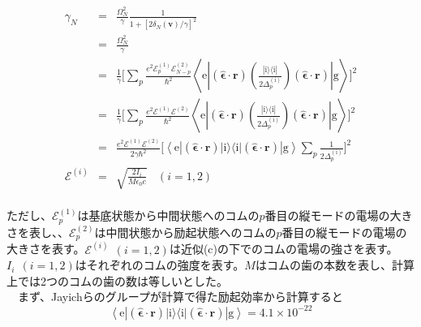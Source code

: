 \documentclass[uplatex, dvipdfmx, a4paper, report, papersize, 11pt]{jsbook}
\begin{document}
\begin{eqnarray}
  \gamma_N &=& \frac{\Omega^2_N}{\gamma}\frac{1}{1 + [2\delta_N(\bm{v})/\gamma]^2} \nonumber\\
  &=& \frac{\Omega^2_N}{\gamma}  \nonumber\\
  &=& \frac{1}{\gamma} \Biggl[ \sum _ { p } \frac { e ^ { 2 } \mathcal { E } ^{(1)}_ { p } \mathcal { E }^{(2)} _ { N - p } } { \hbar ^ { 2 } } \left\langle \mathrm { e } \left| ( \hat { \boldsymbol { \epsilon } } \cdot \mathbf { r } ) \left(  \frac { | \mathrm { i } \rangle \langle \mathrm { i } | } { 2 \Delta _ { p } ^ { ( \mathrm { i } ) } } \right) ( \hat { \boldsymbol { \epsilon } } \cdot \mathbf { r } ) \right| \mathrm { g } \right\rangle \Biggr]^2 \nonumber \\
  &=& \frac{1}{\gamma} \Biggl[ \sum _ { p } \frac { e ^ { 2 } \mathcal { E }^{(1)} \mathcal { E } ^ {(2)} } { \hbar ^ { 2 } } \left\langle \mathrm { e } \left| ( \hat { \boldsymbol { \epsilon } } \cdot \mathbf { r } ) \left(  \frac { | \mathrm { i } \rangle \langle \mathrm { i } | } { 2 \Delta _ { p } ^ { ( \mathrm { i } ) } } \right) ( \hat { \boldsymbol { \epsilon } } \cdot \mathbf { r } ) \right| \mathrm { g } \right\rangle \Biggr]^2 \nonumber \\
  &=& \frac{e^2  \mathcal { E } ^ {(1)} \mathcal { E } ^ {(2)}}{ 2 \gamma \hbar ^ { 2 }  }\Biggl[ \left\langle \mathrm { e } \left| ( \hat { \boldsymbol { \epsilon } } \cdot \mathbf { r } ) | \mathrm { i } \rangle \langle \mathrm { i } |  ( \hat { \boldsymbol { \epsilon } } \cdot \mathbf { r } ) \right| \mathrm { g } \right\rangle\sum _ { p }\frac{1}{2 \Delta _ { p } ^ { ( \mathrm { i } ) }} \Biggr]^2\\
  \mathcal{E}^{(i)} &=&  \sqrt{\frac{2 I_{i}}{M \epsilon_0 c}}\ \ \ \ (i = 1,2)
\end{eqnarray}\\
ただし、$\mathcal{E}^(1)_p$は基底状態から中間状態へのコムの$p$番目の縦モードの電場の大きさを表し、、$\mathcal{E}^(2)_p$は中間状態から励起状態へのコムの$p$番目の縦モードの電場の大きさを表す。$\mathcal{E}^{(i)}\ \ (i = 1,2)$は近似(c)の下でのコムの電場の強さを表す。$I_{i}\ \ (i = 1,2)$はそれぞれのコムの強度を表す。$M$はコムの歯の本数を表し、計算上では2つのコムの歯の数は等しいとした。\\
　まず、Jayichらのグループが計算で得た励起効率から計算すると
\begin{equation}
\left\langle \mathrm { e } \left| ( \hat { \boldsymbol { \epsilon } } \cdot \mathbf { r } ) | \mathrm { i } \rangle \langle \mathrm { i } |  ( \hat { \boldsymbol { \epsilon } } \cdot \mathbf { r } ) \right| \mathrm { g } \right\rangle = 4.1 \times 10^{-22}
\end{equation}
\end{document}
